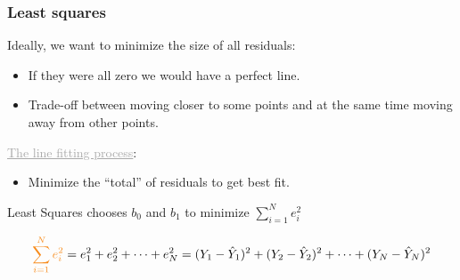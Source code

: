 \documentclass{beamer}
\newcommand{\dg}[1]{\textcolor{darkgray}{#1}}
\newcommand{\bl}{\color{lightblue}}
\newcommand{\rd}{\color{burntorange}}
\newcommand{\bk}{\color{black}}
\newcommand{\bi}{\begin{itemize}}
\newcommand{\ib}{\end{itemize}}
\newcommand{\p}{\item}
\newcommand{\sk}{\vspace{.5cm}}
\begin{document}

\begin{frame}
\frametitle{Least squares} \vspace{-0.5cm}

\sk
\sk
Ideally, we want to minimize the size of all residuals: \vspace{2mm}
\bi
\p If they were all zero we would have a perfect line.
\p Trade-off between moving closer to some points and at the same time moving away from other points.
\ib

\pause

\sk
\dg{\underline{The line fitting process}}: \vspace{2mm}
\bi
\p Minimize the ``total'' of residuals to get best fit.
\ib

\vspace{-3mm}

\pause
\begin{center}\bl \large
Least Squares chooses $b_0$ and $b_1$ to minimize \rd $\sum_{i=1}^N e^2_i$\bk
\end{center}
$$
{\rd \sum_{i=1}^N e^2_i} = e^2_1 + e^2_2 + \dots + e^2_N = (Y_1 - \hat{Y}_1)^2 +(Y_2 - \hat{Y}_2)^2+\dots+(Y_N - \hat{Y}_N)^2
 $$


\end{frame}
%
%
%
%
%
%




%
%
%
\end{document}
